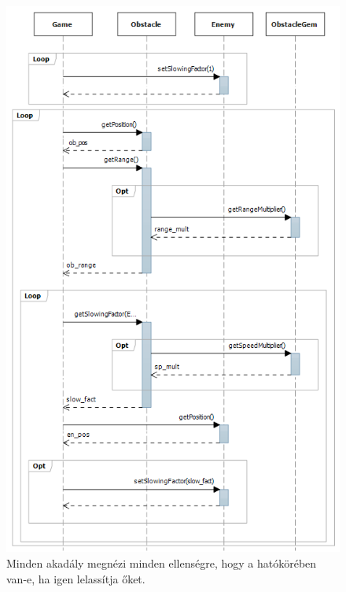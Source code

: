 \begin{figure}[H]
\begin{center}
\includegraphics[width=14cm]{images/ch04/slow_enemy.png}
\caption{Minden akadály megnézi minden ellenségre, hogy a hatókörében van-e, ha igen lelassítja őket.}
\label{fig:adding_gem}
\end{center}
\end{figure}

